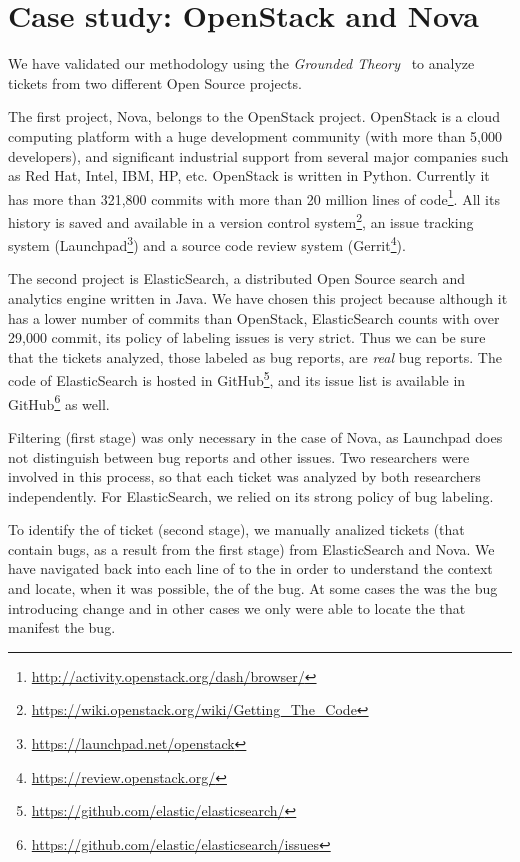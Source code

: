 \documentclass[a4paper, 12pt]{book}
\begin{document}
\section{Case study: OpenStack and Nova}
\label{sec:case}

We have validated our methodology using the \emph{Grounded Theory}~\cite{charmaz2014constructing} to analyze tickets from two different Open Source projects.

The first project, Nova, belongs to the OpenStack project. OpenStack is a cloud computing platform with a huge development community (with more than 5,000 developers), and significant industrial support from several major companies such as Red Hat, Intel, IBM, HP, etc. OpenStack is written in Python. Currently it has more than 321,800 commits with more than 20 million lines of code\footnote{\url{http://activity.openstack.org/dash/browser/}}. All its history is saved and available in a version control system\footnote{\url{https://wiki.openstack.org/wiki/Getting_The_Code}}, an issue tracking system (Launchpad\footnote{\url{https://launchpad.net/openstack}}) and a source code review system (Gerrit\footnote{\url{https://review.openstack.org/}}).

The second project is ElasticSearch, a distributed Open Source search and analytics engine written in Java. We have chosen this project because although it has a lower number of commits than OpenStack, ElasticSearch counts with over 29,000 commit, its policy of labeling issues is very strict. Thus we can be sure that the tickets analyzed, those labeled as bug reports, are \emph{real} bug reports. The code of ElasticSearch is hosted in GitHub\footnote{\url{https://github.com/elastic/elasticsearch/}}, and its issue list is available in GitHub\footnote{\url{https://github.com/elastic/elasticsearch/issues}} as well.

Filtering (first stage) was only necessary in the case of Nova, as Launchpad does not distinguish between bug reports and other issues. Two researchers were involved in this process, so that each ticket was analyzed by both researchers independently. For ElasticSearch, we relied on its strong policy of bug labeling.

To identify the \FFC of ticket (second stage), we manually analized tickets (that contain bugs, as a result from the first stage) from ElasticSearch and Nova. We have navigated back into each line of to the \BFC in order to understand the context and locate, when it was possible, the \FFC of the bug. At some cases the \FFC was the bug introducing change and in other cases we only were able to locate the \FFC that manifest the bug.
\end{document}
